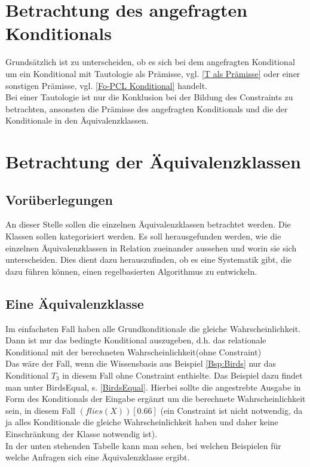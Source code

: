 \documentclass[draft]{scrreprt}
\begin{document}
 












\section{Betrachtung des angefragten Konditionals}
Grundsätzlich ist zu unterscheiden, ob es sich bei dem angefragten Konditional um ein Konditional mit Tautologie als Prämisse, vgl. \ref{T als Prämisse} oder einer sonstigen Prämisse, vgl. \ref{Fo-PCL Konditional} handelt.\\
Bei einer Tautologie ist nur die Konklusion bei der Bildung des Constraints zu betrachten, ansonsten die Prämisse des angefragten Konditionals und die der Konditionale in den Äquivalenzklassen.


\section{Betrachtung der Äquivalenzklassen}
\subsection{Vorüberlegungen}
An dieser Stelle sollen die einzelnen Äquivalenzklassen betrachtet werden. Die Klassen sollen kategorisiert werden. Es soll herausgefunden werden, wie die einzelnen Äquivalenzklassen in Relation zueinander aussehen und worin sie sich unterscheiden. Dies dient dazu herauszufinden, ob es eine Systematik gibt, die dazu führen können, einen regelbasierten Algorithmus zu entwickeln. 
\label{Eine Äquivalenzklasse}
\subsection{Eine Äquivalenzklasse}
Im einfachsten Fall haben alle Grundkonditionale die gleiche Wahrscheinlichkeit. Dann ist nur das bedingte Konditional auszugeben, d.h. das relationale Konditional mit der berechneten Wahrscheinlichkeit(ohne Constraint)\\
Das wäre der Fall, wenn die Wissensbasis aus Beispiel \ref{Bsp:Birds} nur das Konditional $ T_3 $ in diesem Fall ohne Constraint enthielte. Das Beispiel dazu findet man unter BirdsEqual, s. \ref{BirdsEqual}. Hierbei sollte die angestrebte Ausgabe  in Form des Konditionals der Eingabe ergänzt um die berechnete Wahrscheinlichkeit sein, in diesem Fall $ (flies(X)) [0.66]$ (ein Constraint ist nicht notwendig, da ja alles Konditionale die gleiche Wahrscheinlichkeit haben und daher keine Einschränkung der Klasse notwendig ist).\\
In der unten stehenden Tabelle kann man sehen, bei welchen Beispielen für welche Anfragen sich eine Äquivalenzklasse ergibt. 
\end{document}
